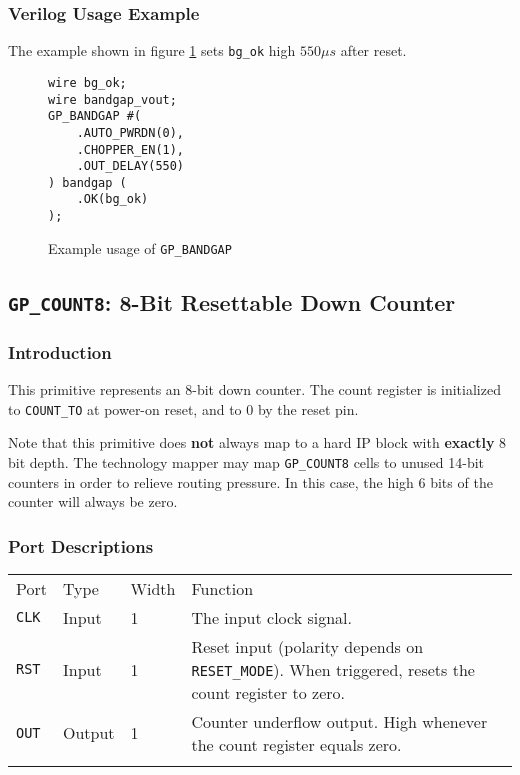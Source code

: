 \documentclass[11pt]{article}
\renewcommand\emph\textbf
\newcommand{\tokenstyle}[1]{\texttt{#1}}
\newcommand{\wirestyle}[1]{\texttt{#1}}
\newcommand{\whenstyle}[1]{{\fontseries{sb}\selectfont#1}}
\newcommand{\thinhline}{\Xhline{1\arrayrulewidth}}
\newcommand{\thickhline}{\Xhline{2.5\arrayrulewidth}}
\begin{document}
\subsubsection{Verilog Usage Example}

The example shown in figure \ref{gp-bandgap-example} sets \wirestyle{bg\_ok} high $550 \mu s$ after reset.

\begin{figure}[h]
\begin{lstlisting}
wire bg_ok;
wire bandgap_vout;
GP_BANDGAP #(
	.AUTO_PWRDN(0),
	.CHOPPER_EN(1),
	.OUT_DELAY(550)
) bandgap (
	.OK(bg_ok)
);
\end{lstlisting}
\caption{Example usage of \tokenstyle{GP\_BANDGAP}}
\label{gp-bandgap-example}
\end{figure}


\pagebreak
\subsection{\tokenstyle{GP\_COUNT8}: 8-Bit Resettable Down Counter}
\label{gp-count8}

\subsubsection{Introduction}
This primitive represents an 8-bit down counter. The count register is initialized to \tokenstyle{COUNT\_TO} at 
power-on reset, and to 0 by the reset pin.

Note that this primitive does \emph{not} always map to a hard IP block with \emph{exactly} 8 bit depth. The technology
mapper may map \tokenstyle{GP\_COUNT8} cells to unused 14-bit counters in order to relieve routing pressure.
In this case, the high 6 bits of the counter will always be zero.

\subsubsection{Port Descriptions}

\begin{tabularx}{\textwidth}{lllX}
\thinhline
\whenstyle{Port} & \whenstyle{Type} & \whenstyle{Width} & \whenstyle{Function} \\
\thickhline
\tokenstyle{CLK} & Input & 1 & The input clock signal. \\
\thinhline
\tokenstyle{RST} & Input & 1 & Reset input (polarity depends on \tokenstyle{RESET\_MODE}).
	When triggered, resets the count register to zero. \\
\thinhline
\tokenstyle{OUT} & Output & 1 & Counter underflow output. High whenever the count register equals zero. \\
\thinhline
\end{tabularx}
\end{document}
